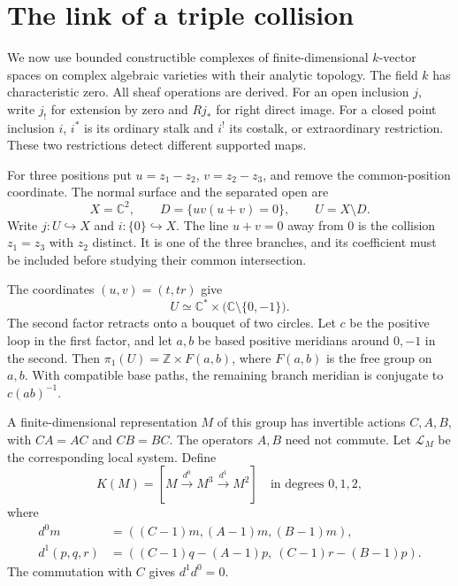 \section{The link of a triple collision}
\label{cycoll:sec:link}

We now use bounded constructible complexes of finite-dimensional
$k$-vector spaces on complex algebraic varieties with their
analytic topology. The field $k$ has characteristic zero. All
sheaf operations are derived. For an open inclusion $j$, write
$j_!$ for extension by zero and $Rj_*$ for right direct image.
For a closed point inclusion $i$, $i^*$ is its ordinary stalk
and $i^!$ its costalk, or extraordinary restriction. These two
restrictions detect different supported maps.

For three positions put $u=z_1-z_2$, $v=z_2-z_3$, and remove
the common-position coordinate. The normal surface and the
separated open are
\begin{equation}\label{cycoll:eq:three-lines}
 X=\mathbb C^2,\qquad D=\{uv(u+v)=0\},\qquad U=X\setminus D.
\end{equation}
Write $j:U\hookrightarrow X$ and $i:\{0\}\hookrightarrow X$.
The line $u+v=0$ away from $0$ is the collision $z_1=z_3$
with $z_2$ distinct. It is one of the three branches, and its
coefficient must be included before studying their common
intersection.

The coordinates $(u,v)=(t,tr)$ give
\[
 U\simeq\mathbb C^*\times
       \bigl(\mathbb C\setminus\{0,-1\}\bigr).
\]
The second factor retracts onto a bouquet of two circles.
Let $c$ be the positive loop in the first factor, and let $a,b$
be based positive meridians around $0,-1$ in the second. Then
$\pi_1(U)=\mathbb Z\times F(a,b)$, where $F(a,b)$ is the free
group on $a,b$. With compatible base paths, the remaining
branch meridian is conjugate to $c(ab)^{-1}$.

A finite-dimensional representation $M$ of this group has
invertible actions $C,A,B$, with
$CA=AC$ and $CB=BC$. The operators $A,B$ need not commute.
Let $\mathcal L_M$ be the corresponding local system. Define
\begin{equation}\label{cycoll:eq:link-complex}
 K(M)=\left[M\xrightarrow{d^0}M^3\xrightarrow{d^1}M^2\right]
 \quad\text{in degrees }0,1,2,
\end{equation}
where
\begin{align*}
 d^0m&=((C-1)m,(A-1)m,(B-1)m),\\
 d^1(p,q,r)&=((C-1)q-(A-1)p,\ (C-1)r-(B-1)p).
\end{align*}
The commutation with $C$ gives $d^1d^0=0$.

